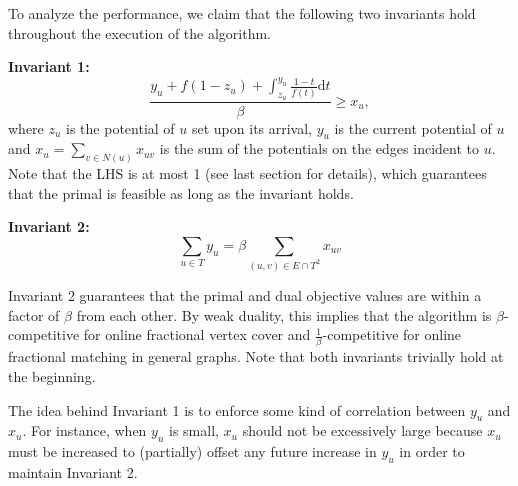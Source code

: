 \documentclass{article}
\begin{document}
To analyze the performance, we claim that the following two invariants hold throughout the execution of the algorithm.

\textbf{Invariant 1:} $$\frac{y_{u}+f(1-z_u)+\int_{z_u}^{y_{u}}\frac{1-t}{f(t)}\mathrm{d}t}{\beta}\geq x_{u},$$ where $z_u$ is the potential of $u$ set upon its arrival, $y_u$ is the current potential of $u$ and $x_u = \sum_{v \in N(u)} x_{uv}$ is the sum of the potentials on the edges incident to $u$. Note that the LHS is at most 1 (see last section for details), which guarantees that the primal is feasible as long as the invariant holds.

\textbf{Invariant 2:} $$\sum_{u\in T} y_{u}=\beta\sum_{(u,v)\in E\cap T^2} x_{uv}$$

Invariant 2 guarantees that the primal and dual objective values are within a factor of $\beta$ from each other. By weak duality, this implies that the algorithm is $\beta$-competitive for online fractional vertex cover and $\frac{1}{\beta}$-competitive for online fractional matching in general graphs.
Note that both invariants trivially hold at the beginning. 

The idea behind Invariant 1 is to enforce some kind of correlation between $y_u$ and $x_u$. For instance, when $y_u$ is small, $x_u$ should not be excessively large because $x_u$ must be increased to (partially) offset any future increase in $y_u$ in order to maintain Invariant 2.


%
\end{document}
